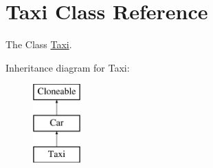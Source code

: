 \hypertarget{class_taxi}{\section{Taxi Class Reference}
\label{class_taxi}
}


The Class \hyperlink{class_taxi}{Taxi}.  


Inheritance diagram for Taxi\+:\begin{figure}[H]
\begin{center}
\leavevmode
\includegraphics[height=3.000000cm]{class_taxi}
\end{center}
\end{figure}
